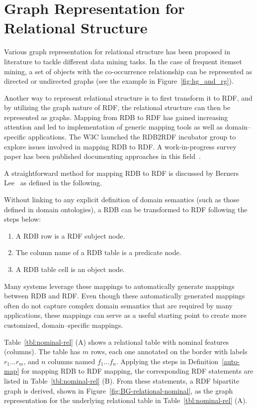 \section{Graph Representation for Relational Structure}
Various graph representation for relational structure has been proposed in literature to tackle different data mining tasks. In the case of frequent itemset mining, a set of objects with the co-occurrence relationship can be represented as directed or undirected graphs (see the example in Figure~\ref{fig:hg_and_rg}).

Another way to represent relational structure is to first transform it to RDF, and by utilizing the graph nature of RDF, the relational structure can then be represented as graphs. Mapping from RDB to RDF has gained increasing attention and led to implementation of generic mapping tools as well as domain--specific applications.  The W3C launched the RDB2RDF incubator group to explore issues involved in mapping RDB to RDF. A work-in-progress survey paper has been published documenting approaches in this field~\cite{RDB2RDF}.

A straightforward method for mapping RDB to RDF is discussed by Berners Lee~\cite{TBL98} as defined in the following.

\begin{mydef}
Without linking to any explicit definition of domain semantics (such as those defined in domain ontologies), a RDB can be transformed to RDF following the steps below:
\begin{enumerate}
\label{auto-map}
\item A RDB row is a RDF subject node.
\item The column name of a RDB table is a predicate node.
\item A RDB table cell is an object node.
\end{enumerate}
\end{mydef}

Many systems leverage these mappings to automatically generate mappings between RDB and RDF. Even though these automatically generated mappings often do not capture complex domain semantics that are required by many applications, these mappings can serve as a useful starting point to create more customized, domain--specific mappings.

\begin{myexp}
Table~\ref{tbl:nominal-rel} (A) shows a relational table with nominal features (columns). The table has $m$ rows, each one annotated on the border with labels $r_1 \ldots r_m$, and $n$ columns named $f_1 \ldots f_n$. Applying the steps in Definition~\ref{auto-map} for mapping RDB to RDF mapping, the corresponding RDF statements are listed in Table~\ref{tbl:nominal-rel} (B). From these statements, a RDF bipartite graph is derived, shown in Figure~\ref{fig:BG-relational-nominal}, as the graph representation for the underlying relational table in Table~\ref{tbl:nominal-rel} (A).
\end{myexp}

